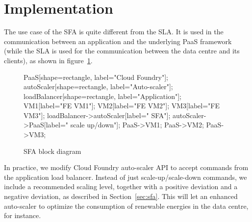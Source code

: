 \section{Implementation}
\label{sec:implem}

The use case of the SFA is quite different from the SLA. 
It is used in the communication between an application and the underlying PaaS framework (while the SLA is used for the communication between the data centre and its clients), as shown in figure~\ref{fig:SFABlock}.

\begin{figure}[h]
\label{fig:SFABlock}
\centering
{}
{
   PaaS[shape=rectangle, label="Cloud Foundry"];
   autoScaler[shape=rectangle, label="Auto-scaler"];
   loadBalancer[shape=rectangle, label="Application"];
   VM1[label="FE VM1"];
   VM2[label="FE VM2"];
   VM3[label="FE VM3"];
   loadBalancer->autoScaler[label=" SFA"];
   autoScaler->PaaS[label=" scale up/down"];
   PaaS->VM1;
   PaaS->VM2;
   PaaS->VM3;
}
\caption{SFA block diagram}
\end{figure}

In practice, we modify Cloud Foundry auto-scaler API to accept commands from the application load balancer.
Instead of just scale-up/scale-down commands, we include a recommended scaling level, together with a positive deviation and a negative deviation, as described in Section~\ref{sec:sfa}.
This will let an enhanced auto-scaler to optimize the consumption of renewable energies in the data centre, for instance. 
